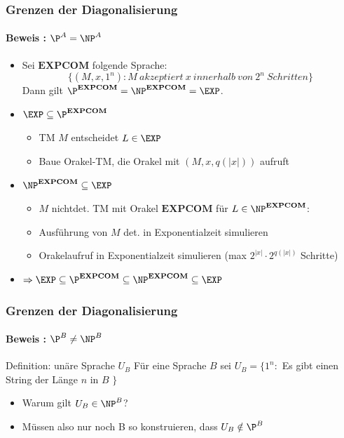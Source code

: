 \begin{frame}
	\frametitle{Grenzen der Diagonalisierung}
	\framesubtitle{Beweis : ${\P}^A = {\NP}^A$ }
	\pause
	\begin{itemize} [<+->]
		\item Sei $\mathbf{EXPCOM}$ folgende Sprache: \[\{(M,x,1^n) : M \  akzeptiert \ x \ innerhalb \ von \ 2^n \ Schritten  \}
		 \] 
			Dann gilt ${\P}^{\mathbf{EXPCOM}} = {\NP}^{\mathbf{EXPCOM}} = \EXP$.
			\item $ \EXP \subseteq {\P}^{\mathbf{EXPCOM}} $
			\begin{itemize}
				\item TM $M$ entscheidet $L \in \EXP$
				\item Baue Orakel-TM, die Orakel mit $(M,x,q(|x|))$ aufruft
			\end{itemize}
			\item ${\NP}^{\mathbf{EXPCOM}} \subseteq \EXP$
			\begin{itemize}
				\item  $M$  nichtdet. TM mit Orakel $\mathbf{EXPCOM}$ für $L \in {\NP}^{\mathbf{EXPCOM}}$: 
				\item Ausführung von $M$ det. in Exponentialzeit simulieren
				\item Orakelaufruf in Exponentialzeit simulieren (max $2^{|x|} \cdot 2^{q(|x|)}$ Schritte)	
			\end{itemize}
			
			
			\item $\Rightarrow \EXP \subseteq{\P}^{\mathbf{EXPCOM}} \subseteq {\NP}^{\mathbf{EXPCOM}} \subseteq \EXP$ 
			
	\end{itemize}
\end{frame}

\begin{frame}
	\frametitle{Grenzen der Diagonalisierung}
	\framesubtitle{Beweis : ${\P}^B \neq {\NP}^B$}
	\begin{KITinfoblock}{Definition: unäre Sprache $U_B$}
		Für eine Sprache $B$ sei $U_B = \lbrace 1^n :$ Es gibt einen String
		der L\"ange $n$ in $B$ $\rbrace $
	\end{KITinfoblock}	
	\pause
	
	\begin{itemize}[<+->]
		\item Warum gilt $U_B \in {\NP}^B$?
		\item M\"ussen also nur noch B so konstruieren, dass $U_B \notin {\P}^B$
	\end{itemize}
\end{frame}

